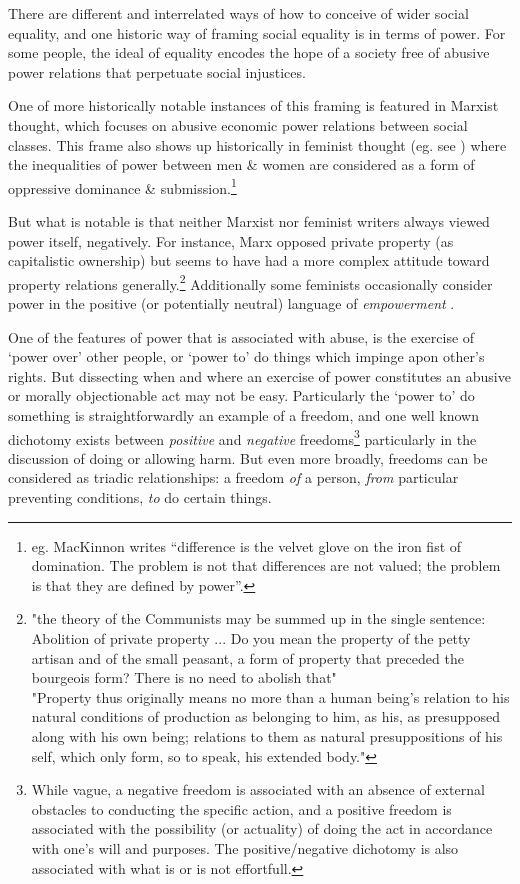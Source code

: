 There are different and interrelated ways of how to conceive of wider social equality, and one historic way of framing social equality is in terms of power.
For some people, the ideal of equality encodes the hope of a society free of abusive power relations that perpetuate social injustices.

One of more historically notable instances of this framing is featured in Marxist thought, which focuses on abusive economic power relations between social classes. This frame also shows up historically in feminist thought (eg. see \cite{Cudd2006-CUDAO}) where the inequalities of power between men \& women are considered as a form of oppressive dominance \& submission.\footnote{eg. MacKinnon writes ``difference is the velvet glove on the iron fist of domination. The problem is not that differences are not valued; the problem is that they are defined by power''\cite{mackinnon1989toward}.}

But what is notable is that neither Marxist nor feminist writers always viewed power itself, negatively.
For instance, Marx opposed private property (as capitalistic ownership) but seems to have had a more complex attitude toward property relations generally.\footnote{"the theory of the Communists may be summed up in the single sentence: Abolition of private property ... Do you mean the property of the petty artisan and of the small peasant, a form of property that preceded the bourgeois form? There is no need to abolish that"\cite{MarxGutenberg}\\"Property thus originally means no more than a human being's relation to his natural conditions of production as belonging to him, as his, as presupposed along with his own being; relations to them as natural presuppositions of his self, which only form, so to speak, his extended body."\cite[Notebook V]{marx1993grundrisse}}
Additionally some feminists occasionally consider power in the positive (or potentially neutral) language of \textit{empowerment} \cite{doi:10.1111/j.1527-2001.1998.tb01350.x}.

One of the features of power that is associated with abuse, is the exercise of `power over' other people, or `power to' do things which impinge apon other's rights.\cite{doi:10.1111/j.1527-2001.1998.tb01350.x}
But dissecting when and where an exercise of power constitutes an abusive or morally objectionable act may not be easy.
Particularly the `power to' do something is straightforwardly an example of a freedom, and one well known dichotomy exists between \textit{positive} and \textit{negative} freedoms\footnote{While vague, a negative freedom is associated with an absence of external obstacles to conducting the specific action, and a positive freedom is associated with the possibility (or actuality) of doing the act in accordance with one's will and purposes. The positive/negative dichotomy is also associated with what is or is not effortfull.\cite{Mossel2009-MOSNA}} particularly in the discussion of doing or allowing harm.
But even more broadly, freedoms can be considered as triadic relationships: a freedom \textit{of} a person, \textit{from} particular preventing conditions, \textit{to} do certain things.\cite{Negative_and_Positive_Freedom}

